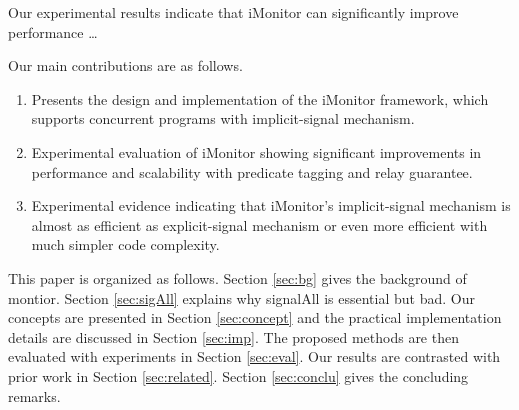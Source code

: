 \documentclass[preprint]{sigplanconf}
\begin{document}
Our experimental results indicate that iMonitor can significantly improve
performance \dots

Our main contributions are as follows.
\begin{enumerate}
    \item Presents the design and implementation of the iMonitor framework,
        which supports concurrent programs with implicit-signal mechanism.
    \item Experimental evaluation of iMonitor showing significant
        improvements in performance and scalability with predicate tagging
        and relay guarantee. 
    \item Experimental evidence indicating that iMonitor's implicit-signal
        mechanism is almost as efficient as explicit-signal mechanism or even 
        more efficient with much simpler code complexity.
\end{enumerate}



This paper is organized as follows. Section \ref{sec:bg} gives the background
of montior. 
Section \ref{sec:sigAll} explains why signalAll is essential but bad. Our 
concepts are presented in Section \ref{sec:concept} and the practical 
implementation details are discussed in Section  \ref{sec:imp}. The proposed 
methods are then evaluated with experiments in Section \ref{sec:eval}. 
Our results are contrasted with prior work in Section \ref{sec:related}. 
Section \ref{sec:conclu} gives the concluding remarks.
\end{document}
